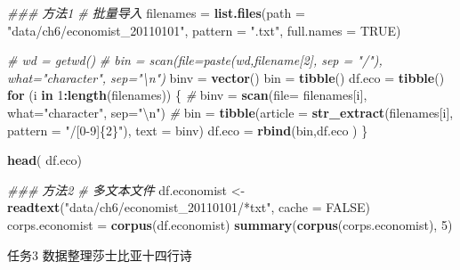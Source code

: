 \documentclass[]{book}
\newenvironment{Shaded}{\begin{snugshade}}{\end{snugshade}}
\newcommand{\CharTok}[1]{\textcolor[rgb]{0.31,0.60,0.02}{#1}}
\newcommand{\CommentTok}[1]{\textcolor[rgb]{0.56,0.35,0.01}{\textit{#1}}}
\newcommand{\ControlFlowTok}[1]{\textcolor[rgb]{0.13,0.29,0.53}{\textbf{#1}}}
\newcommand{\DataTypeTok}[1]{\textcolor[rgb]{0.13,0.29,0.53}{#1}}
\newcommand{\DecValTok}[1]{\textcolor[rgb]{0.00,0.00,0.81}{#1}}
\newcommand{\KeywordTok}[1]{\textcolor[rgb]{0.13,0.29,0.53}{\textbf{#1}}}
\newcommand{\NormalTok}[1]{#1}
\newcommand{\OperatorTok}[1]{\textcolor[rgb]{0.81,0.36,0.00}{\textbf{#1}}}
\newcommand{\OtherTok}[1]{\textcolor[rgb]{0.56,0.35,0.01}{#1}}
\newcommand{\StringTok}[1]{\textcolor[rgb]{0.31,0.60,0.02}{#1}}
\begin{document}
\begin{Shaded}
\begin{Highlighting}[]
\CommentTok{### 方法1}
\CommentTok{# 批量导入}
\NormalTok{filenames =}\StringTok{ }\KeywordTok{list.files}\NormalTok{(}\DataTypeTok{path =} \StringTok{"data/ch6/economist_20110101"}\NormalTok{, }\DataTypeTok{pattern =} \StringTok{".txt"}\NormalTok{, }\DataTypeTok{full.names =} \OtherTok{TRUE}\NormalTok{)}

\CommentTok{# wd = getwd()}
\CommentTok{# bin = scan(file=paste(wd,filename[2], sep = "/"), what="character", sep="\textbackslash{}n")}
\NormalTok{binv =}\StringTok{ }\KeywordTok{vector}\NormalTok{()}
\NormalTok{bin =}\StringTok{ }\KeywordTok{tibble}\NormalTok{()}
\NormalTok{df.eco =}\StringTok{ }\KeywordTok{tibble}\NormalTok{()}
\ControlFlowTok{for}\NormalTok{ (i }\ControlFlowTok{in} \DecValTok{1}\OperatorTok{:}\KeywordTok{length}\NormalTok{(filenames)) \{}
  \CommentTok{#}
\NormalTok{  binv =}\StringTok{ }\KeywordTok{scan}\NormalTok{(}\DataTypeTok{file=}\NormalTok{ filenames[i], }
              \DataTypeTok{what=}\StringTok{"character"}\NormalTok{, }
              \DataTypeTok{sep=}\StringTok{"}\CharTok{\textbackslash{}n}\StringTok{"}\NormalTok{)}
  \CommentTok{#}
\NormalTok{  bin =}\StringTok{ }\KeywordTok{tibble}\NormalTok{(}\DataTypeTok{article =} \KeywordTok{str_extract}\NormalTok{(filenames[i], }
                                     \DataTypeTok{pattern =} \StringTok{"/[0-9]\{2\}"}\NormalTok{),}
                                     \DataTypeTok{text =}\NormalTok{ binv)}
\NormalTok{ df.eco  =}\StringTok{ }\KeywordTok{rbind}\NormalTok{(bin,df.eco )}
\NormalTok{\}}

\KeywordTok{head}\NormalTok{( df.eco)}

\CommentTok{### 方法2}
\CommentTok{# 多文本文件}
\NormalTok{df.economist <-}\StringTok{ }\KeywordTok{readtext}\NormalTok{(}\StringTok{"data/ch6/economist_20110101/*txt"}\NormalTok{, }
                    \DataTypeTok{cache =} \OtherTok{FALSE}\NormalTok{)}
\NormalTok{corps.economist =}\StringTok{ }\KeywordTok{corpus}\NormalTok{(df.economist)}
\KeywordTok{summary}\NormalTok{(}\KeywordTok{corpus}\NormalTok{(corps.economist), }\DecValTok{5}\NormalTok{)}
\end{Highlighting}
\end{Shaded}

任务3
数据整理莎士比亚十四行诗
\end{document}

